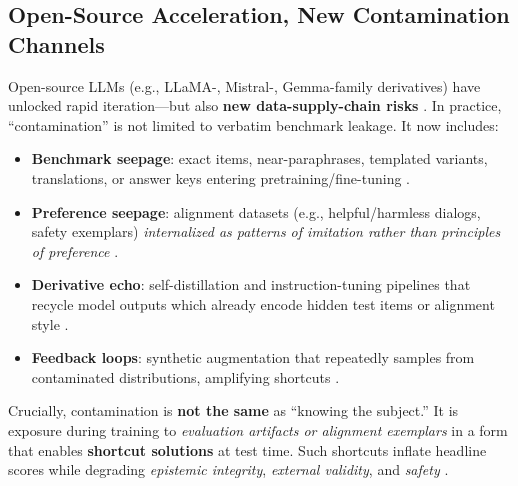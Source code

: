 \documentclass[11pt]{article}
\begin{document}
\subsection{Open-Source Acceleration, New Contamination Channels}
Open-source LLMs (e.g., LLaMA-, Mistral-, Gemma-family derivatives) have unlocked rapid iteration—but also \textbf{new data-supply-chain risks} \citep{dodge2021documenting,sainz2023need}. In practice, ``contamination'' is not limited to verbatim benchmark leakage. It now includes: \citep{deng2024investigating,li2024opencontam}
\begin{itemize}
    \item \textbf{Benchmark seepage}: exact items, near-paraphrases, templated variants, translations, or answer keys entering pretraining/fine-tuning \citep{cobbe2021gsm8k,clark2018arc,lin2022truthfulqa,zellers2019hellaswag}.
    \item \textbf{Preference seepage}: alignment datasets (e.g., helpful/harmless dialogs, safety exemplars) \emph{internalized as patterns of imitation rather than principles of preference} \citep{ouyang2022instructgpt,bai2022harmless,rafailov2023dpo,wang2023selfinstruct,dubois2023alpacafarm}.
    \item \textbf{Derivative echo}: self-distillation and instruction-tuning pipelines that recycle model outputs which already encode hidden test items or alignment style \citep{hinton2015distillation,wang2023selfinstruct,dubois2023alpacafarm}.
    \item \textbf{Feedback loops}: synthetic augmentation that repeatedly samples from contaminated distributions, amplifying shortcuts \citep{shumailov2023curse}.
\end{itemize}
Crucially, contamination is \textbf{not the same} as “knowing the subject.” It is exposure during training to \emph{evaluation artifacts or alignment exemplars} in a form that enables \textbf{shortcut solutions} at test time. Such shortcuts inflate headline scores while degrading \emph{epistemic integrity}, \emph{external validity}, and \emph{safety} \citep{sainz2023need,li2024opencontam}.
\end{document}
